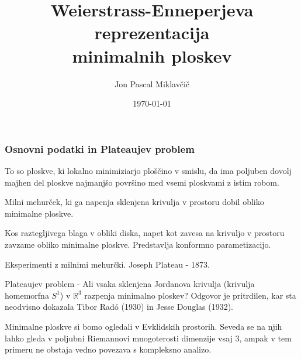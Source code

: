 \documentclass[8pt]{beamer}
\title[Weierstrass-Enneperjeva parametrizacija]{Weierstrass-Enneperjeva reprezentacija\\minimalnih ploskev}
\subtitle{}
\author[Jon Pascal Miklavčič]{Jon Pascal Miklavčič}
\institute[]{Mentor: doc.~dr.~Uroš Kuzman}
\date{\tiny \today}
\theoremstyle{definition}
\theoremstyle{remark}
\theoremstyle{plain}
\numberwithin{equation}{section}  %
\begin{document}
\frame{\titlepage}

\begin{frame}
    \frametitle{Osnovni podatki in Plateaujev problem}
    
    To so ploskve, ki \textcolor{red1}{lokalno minimiziarjo ploščino} v smislu, da ima poljuben dovolj majhen del ploskve najmanjšo površino med vsemi ploskvami z istim robom.
    \pause 
    \vspace{0.8em}
    
    Milni mehurček, ki ga napenja sklenjena krivulja v prostoru dobil obliko minimalne ploskve. 
    
    \vspace{0.8em}
    
    Kos raztegljivega blaga v obliki diska, napet kot zavesa na krivuljo v prostoru zavzame obliko minimalne ploskve. Predstavlja \textcolor{red1}{konformno parametizacijo}.
    \pause 
    \vspace{0.8em}
    
    Eksperimenti z milnimi mehurčki. \textcolor{red1}{Joseph Plateau} - 1873. 
    
    \vspace{0.8em}
    
    \textcolor{red1}{Plateaujev problem} - Ali vsaka sklenjena Jordanova krivulja (krivulja homemorfna $S^1$) v $\mathbb{R}^3$ razpenja minimalno ploskev? Odgovor je pritrdilen, kar sta neodvisno dokazala Tibor Radó (1930) in Jesse Douglas (1932).
    \pause 
    \vspace{0.8em}

    Minimalne ploskve si bomo ogledali v Evklidskih prostorih. Seveda se na njih lahko gleda v poljubni Riemannovi mnogoterosti dimenzije vsaj $3$, ampak v tem primeru ne obstaja vedno povezava s kompleksno analizo. 

\end{frame}
\end{document}
